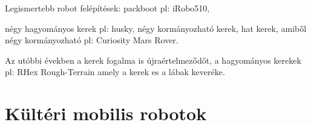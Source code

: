 Legismertebb robot felépítések: packboot pl: iRobo510, 

négy hagyományos kerek pl: husky, négy kormányozható kerek, hat kerek, amiből négy kormányozható pl: Curiosity Mars Rover. 

Az utóbbi években a kerek fogalma is újraértelmeződőt, a hagyományos kerekek pl: RHex Rough-Terrain amely a kerek es a lábak keveréke. 





\section{Kültéri mobilis robotok} 





 

 

 

 

 \newpage 



 



